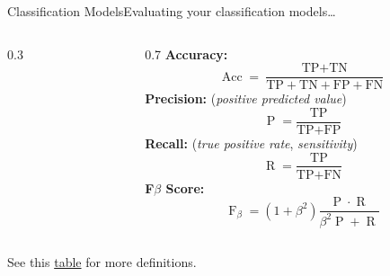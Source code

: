 \begin{frame}{Classification Models}{Evaluating your classification models\dots}
    \begin{columns}[c]
        \begin{column}{0.3\textwidth}
            \centering
            
        \end{column}
        \hfil
        \begin{column}{0.7\textwidth}
            \textbf{Accuracy:}
            \begin{equation*}
                \operatorname{Acc} = \frac{\text{TP} + \text{TN}}{\text{TP} + \text{TN} + \text{FP} + \text{FN}}
            \end{equation*}
            \textbf{Precision:} (\emph{positive predicted value})
            \begin{equation*}
                \operatorname{P} = \frac{\text{TP}}{\text{TP} + \text{FP}}
            \end{equation*}
            \textbf{Recall:} (\emph{true positive rate}, \emph{sensitivity})
            \begin{equation*}
                \operatorname{R} = \frac{\text{TP}}{\text{TP} + \text{FN}}
            \end{equation*}
            \textbf{F$\beta$ Score:}
            \begin{equation*}
                \operatorname{F}_{\beta} = (1 + \beta^2) \frac{\operatorname{P} \cdot \operatorname{R}}{\beta^2 \operatorname{P} + \operatorname{R}}
            \end{equation*}
        \end{column}
    \end{columns}

    \vfill

    {\tiny See this \href{https://en.wikipedia.org/wiki/Template:Diagnostic_testing_diagram}{table} for more definitions.}
\end{frame}


